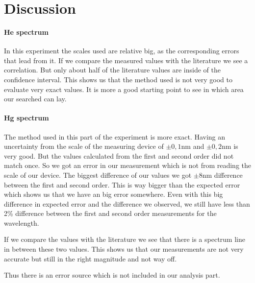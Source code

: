 \section{Discussion}


\paragraph{He spectrum}
In this experiment the scales used are relative big, as the corresponding errors that lead from it.
If we compare the measured values with the literature we see a correlation. 
But only about half of the literature values are inside of the confidence interval.
This shows us that the method used is not very good to evaluate very exact values.
It is more a good starting point to see in which area our searched can lay.

 

\paragraph{Hg spectrum}

The method used in this part of the experiment is more exact.
Having an uncertainty from the scale of the measuring device of $\pm0,1$\si{\nano\m} and $\pm0,2$\si{\nano\m} is very good.
But the values calculated from the first and second order did not match once. 
So we got an error in our measurement which is not from reading the scale of our device.
The biggest difference of our values we got $\pm 8$\si{\nano\m} difference between the first and second order. 
This is way bigger than the expected error which shows us that we have an big error somewhere.
Even with this big difference in expected error and the difference we observed, we still have less than 2\% difference between the first and second order measurements for the wavelength.

If we compare the values with the literature we see that there is a spectrum line in between these two values.
This shows us that our measurements are not very accurate but still in the right magnitude and not way off.

Thus there is an error source which is not included in our analysis part.



